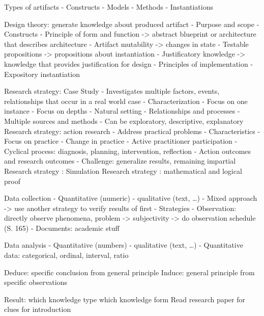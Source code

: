 Types of artifacts
- Constructs
- Models
- Methods
- Instantiations

Design theory: generate knowledge about produced artifact
- Purpose and scope
- Constructs
- Principle of form and function -> abstract blueprint or architecture that describes architecture
- Artifact mutability -> changes in state
- Testable propositions -> propositions about instantiation
- Justificatory knowledge -> knowledge that provides justification for design
- Principles of implementation
- Expository instantiation

Research strategy: Case Study
- Investigates multiple factors, events, relationships that occur in a real world case
- Characterization
    - Focus on one instance
    - Focus on depths
    - Natural setting
    - Relationships and processes
    - Multiple sources and methods
- Can be exploratory, descriptive, explanatory
Research strategy: action research
- Address practical problems
- Characteristics
    - Focus on practice
    - Change in practice
    - Active practitioner participation
    - Cyclical process: diagnosis, planning, intervention, reflection
    - Action outcomes and research outcomes
- Challenge: generalize results, remaining impartial
Research strategy	: Simulation
Research strategy	: mathematical and logical proof

Data collection
- Quantitative (numeric) - qualitative (text, …)
- Mixed approach -> use another strategy to verify results of first
- Strategies
    - Observation: directly observe phenomena, problem -> subjectivity -> do observation schedule (S. 165)
    - Documents: academic stuff

Data analysis
- Quantitative (numbers) - qualitative (text, …)
- Quantitative data: categorical, ordinal, interval, ratio

Deduce: specific conclusion from general principle
Induce: general principle from specific observations


Result: which knowledge type which knowledge form
Read research paper for clues for introduction
